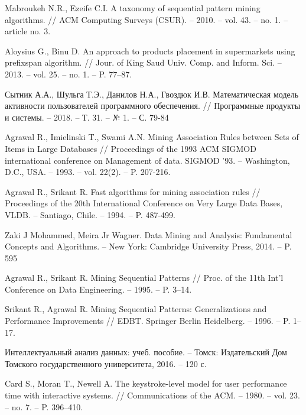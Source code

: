 \begin{thebibliography}{1}
	Mabroukeh N.R., Ezeife C.I.
	A taxonomy of sequential pattern mining algorithms.
	// ACM Computing Surveys (CSUR). -- 2010. -- vol. 43. -- no. 1. -- article no. 3.
	
	Aloysius G., Binu D.
	An approach to products placement in supermarkets using prefixspan algorithm.
	// Jour. of King Saud Univ. Comp. and Inform. Sci. -- 2013. -- vol. 25. -- no. 1. -- P. 77–87.
	
	Сытник А.А., Шульга Т.Э., Данилов Н.А., Гвоздюк И.В.
	Математическая модель активности пользователей программного обеспечения.
	// Программные продукты и системы. -- 2018. -- Т. 31. -- № 1. -- С. 79-84 
	
	Agrawal R., Imielinski T., Swami A.N.
	Mining Association Rules between Sets of Items in Large Databases
	// Proceedings of the 1993 ACM SIGMOD international conference on Management of data. SIGMOD '93. -- Washington, D.C., USA. -- 1993. -- vol. 22(2). -- P. 207-216.
	
	Agrawal R., Srikant R.
	Fast algorithms for mining association rules
	// Proceedings of the 20th International Conference on Very Large Data Bases, VLDB. -- Santiago, Chile. -- 1994. -- P. 487-499.
	
	Zaki J Mohammed, Meira Jr Wagner. Data Mining and Analysis: Fundamental Concepts and Algorithms. -- New York: Cambridge University Press, 2014. -- P. 595
	
	Agrawal R., Srikant R. Mining Sequential Patterns // Proc. of the 11th Int’l
	Conference on Data Engineering. -- 1995. -- P. 3–14.
	
	Srikant R., Agrawal R. Mining Sequential Patterns: Generalizations and
	Performance Improvements // EDBT. Springer Berlin Heidelberg. -- 1996.
	-- P. 1–17.
	
	Интеллектуальный анализ данных: учеб. пособие. --
	Томск: Издательский Дом Томского государственного
	университета, 2016. -- 120 с.
	
	Card S., Moran T., Newell A.
	The keystroke-level model for user performance time with interactive systems.
	// Communications of the ACM. -- 1980. -- vol. 23. -- no. 7. -- P. 396–410.
	
	
\end{thebibliography}
